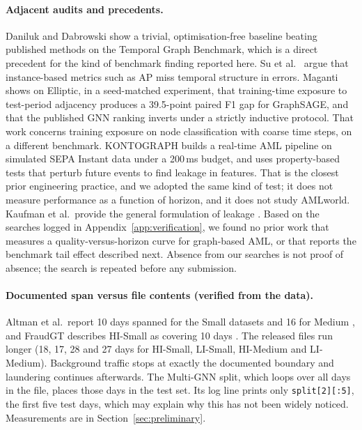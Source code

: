 \documentclass[11pt,a4paper]{article}
\begin{document}
\paragraph{Adjacent audits and precedents.} Daniluk and Dabrowski \cite{daniluk2023global} show a trivial, optimisation-free baseline beating published methods on the Temporal Graph Benchmark, which is a direct precedent for the kind of benchmark finding reported here. Su et al.\ \cite{su2024temporal} argue that instance-based metrics such as AP miss temporal structure in errors. Maganti \cite{maganti2026liability} shows on Elliptic, in a seed-matched experiment, that training-time exposure to test-period adjacency produces a 39.5-point paired F1 gap for GraphSAGE, and that the published GNN ranking inverts under a strictly inductive protocol. That work concerns training exposure on node classification with coarse time steps, on a different benchmark. KONTOGRAPH \cite{abolfadl2026kontograph} builds a real-time AML pipeline on simulated SEPA Instant data under a 200\,ms budget, and uses property-based tests that perturb future events to find leakage in features. That is the closest prior engineering practice, and we adopted the same kind of test; it does not measure performance as a function of horizon, and it does not study AMLworld. Kaufman et al.\ provide the general formulation of leakage \cite{kaufman2012leakage}. Based on the searches logged in Appendix~\ref{app:verification}, we found no prior work that measures a quality-versus-horizon curve for graph-based AML, or that reports the benchmark tail effect described next. Absence from our searches is not proof of absence; the search is repeated before any submission.

\paragraph{Documented span versus file contents (verified from the data).} Altman et al.\ report 10 days spanned for the Small datasets and 16 for Medium \cite{altman2023ibmaml}, and FraudGT describes HI-Small as covering 10 days \cite{lin2024fraudgt}. The released files run longer (18, 17, 28 and 27 days for HI-Small, LI-Small, HI-Medium and LI-Medium). Background traffic stops at exactly the documented boundary and laundering continues afterwards. The Multi-GNN split, which loops over all days in the file, places those days in the test set. Its log line prints only \texttt{split[2][:5]}, the first five test days, which may explain why this has not been widely noticed. Measurements are in Section~\ref{sec:preliminary}.
\end{document}
